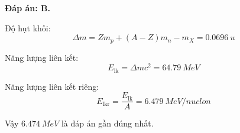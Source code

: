 \begin{enumerate}[label=\bfseries Câu \arabic*:]
	\loigiai
	{		\textbf{Đáp án: B.}
		
		Độ hụt khối:
		$$\Delta m = Zm_p + (A-Z)m_n - m_X = \SI{0.0696}{u}$$
		
		Năng lượng liên kết:
		$$E_\text{lk} = \Delta m c^2 = \SI{64.79}{MeV}$$
		
		Năng lượng liên kết riêng:
		$$E_\text{lkr} = \dfrac{E_\text{lk}}{A} =\SI{6.479}{MeV/nuclon} $$
		
		Vậy $\SI{6.474}{MeV}$ là đáp án gần đúng nhất.
		
	}
\end{enumerate}

